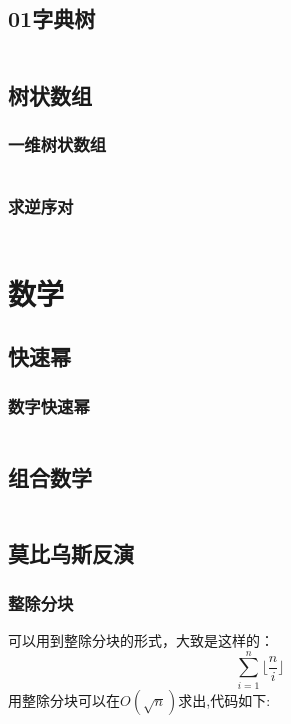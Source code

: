 \documentclass[a4paper,11pt]{article}
\begin{document}
\subsection{01字典树}
\inputminted[breaklines,linenos,frame=leftline]{c++}{DataStruct/trie.cpp}

\subsection{树状数组}
\subsubsection{一维树状数组}
\inputminted[breaklines,linenos,frame=leftline]{c++}{DataStruct/BIT1.cpp}
\subsubsection{求逆序对}
\inputminted[breaklines,linenos,frame=leftline]{c++}{DataStruct/BIT2.cpp}


\newpage
\section{数学}

\subsection{快速幂}
\subsubsection{数字快速幂}
\inputminted[breaklines,linenos,frame=leftline]{c++}{math/quickpow1.cpp}

\subsection{组合数学}
\inputminted[breaklines,linenos,frame=leftline]{c++}{math/com.cpp}

\subsection{莫比乌斯反演}
\subsubsection{整除分块}
可以用到整除分块的形式，大致是这样的：
$$\sum_{i=1}^n \lfloor \frac{n}{i} \rfloor $$
用整除分块可以在$O  (\sqrt{n})$求出,代码如下:
\inputminted[breaklines,linenos,frame=leftline]{c++}{math/RemoveTheBlock.cpp}
\end{document}
